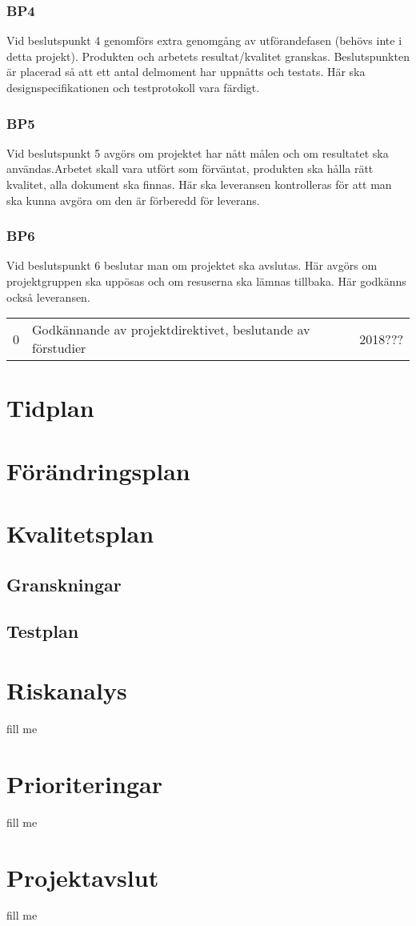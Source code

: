 \documentclass[projektplan/plan.tex]{subfiles}
\begin{document}
\subsubsection*{BP4}
Vid beslutspunkt 4 genomförs extra genomgång av utförandefasen (behövs inte i
detta projekt). Produkten och
arbetets resultat/kvalitet granskas. Beslutspunkten är placerad så att ett
antal delmoment har uppnåtts och testats. Här ska designspecifikationen och
testprotokoll vara färdigt.

\subsubsection*{BP5}
Vid beslutspunkt 5 avgörs om projektet har nått målen och om resultatet ska
användas.Arbetet skall vara utfört som förväntat, produkten ska hålla rätt
kvalitet, alla dokument ska finnas. Här ska leveransen kontrolleras för att man
ska kunna avgöra om den är förberedd för leverans.

\subsubsection*{BP6}
Vid beslutspunkt 6 beslutar man om projektet ska avslutas. Här avgörs om
projektgruppen ska uppösas och om resuserna ska lämnas tillbaka. Här godkänns
också leveransen.

\begin{center}
    \begin{tabular}{| l | l | l |}
    0 & Godkännande av projektdirektivet, beslutande av förstudier & 2018??? 
    \end{tabular}
\end{center}    


\section{Tidplan}

\section{Förändringsplan}

\section{Kvalitetsplan}
\subsection{Granskningar}
\subsection{Testplan}


\section{Riskanalys}
fill me

\section{Prioriteringar}
fill me

\section{Projektavslut}
fill me
\end{document}
